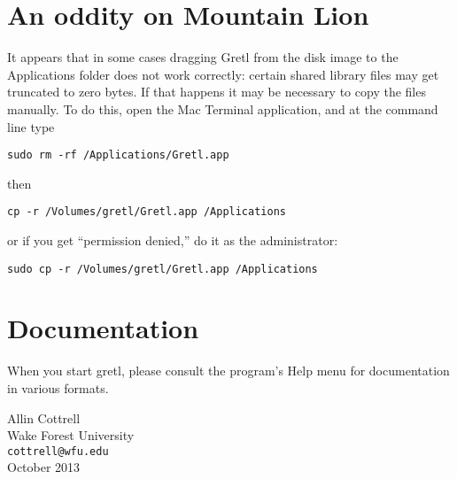 \documentclass[11pt]{article}
\begin{document}
\section{An oddity on Mountain Lion}

It appears that in some cases dragging \textsf{Gretl} from the disk
image to the \textsf{Applications} folder does not work correctly:
certain shared library files may get truncated to zero bytes. If that
happens it may be necessary to copy the files manually. To do this,
open the Mac Terminal application, and at the command line type

\begin{verbatim}
sudo rm -rf /Applications/Gretl.app
\end{verbatim}

then

\begin{verbatim}
cp -r /Volumes/gretl/Gretl.app /Applications
\end{verbatim}

or if you get ``permission denied,'' do it as the administrator:

\begin{verbatim}
sudo cp -r /Volumes/gretl/Gretl.app /Applications
\end{verbatim}

\section{Documentation}
\label{sec:doc}

When you start gretl, please consult the program's Help menu for
documentation in various formats.

\vspace{.25in}

\raggedright
Allin Cottrell \\
Wake Forest University \\
\texttt{cottrell@wfu.edu} \\
October 2013
\end{document}
